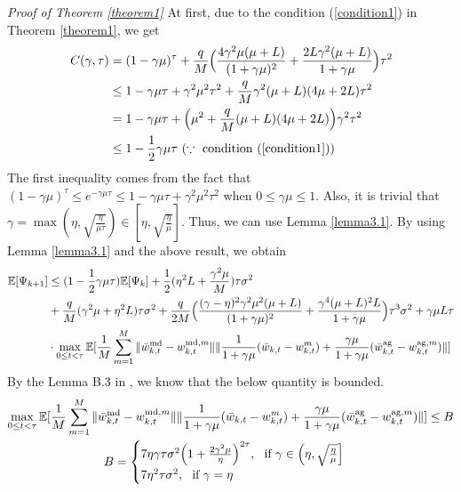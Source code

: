 \documentclass[11pt]{article}
\begin{document}
\emph{Proof of Theorem \ref{theorem1} } At first, due to the condition (\ref{condition1}) in Theorem \ref{theorem1}, we get
\begin{align*}
    C(\gamma, \tau) &= (1-\gamma\mu)^\tau + \frac{q}{M}\Big( \frac{4\gamma^2\mu(\mu + L)}{(1+\gamma\mu)^2} + \frac{2L\gamma^2(\mu+L)}{1+\gamma\mu}\Big)\tau^2 \\
    &\leq 1-\gamma\mu\tau+\gamma^2\mu^2\tau^2 + \frac{q}{M}\gamma^2(\mu+L)(4\mu+2L)\tau^2 \\
    &= 1-\gamma\mu\tau + \Big(\mu^2+\frac{q}{M}(\mu+L)(4\mu+2L)\Big)\gamma^2\tau^2 \\
    &\leq 1 - \frac{1}{2}\gamma\mu\tau \textrm{ }(\because \textrm{ condition } (\ref{condition1}))
\end{align*}
The first inequality comes from the fact that $(1-\gamma\mu)^\tau \leq e^{-\gamma\mu\tau} \leq 1-\gamma\mu\tau+\gamma^2\mu^2\tau^2$ when $0 \leq \gamma\mu \leq 1$.
Also, it is trivial that $\gamma = \max(\eta, \sqrt{\frac{\eta}{\mu\tau}}) \in [\eta, \sqrt{\frac{\eta}{\mu}}]$. Thus, we can use Lemma \ref{lemma3.1}. By using Lemma \ref{lemma3.1} and the above result, we obtain
\begin{align} \label{ineq3.7-1}
    \mathbb{E}[\Psi_{k+1}] &\leq (1-\frac{1}{2}\gamma\mu\tau) \mathbb{E}[\Psi_k] + \frac{1}{2}(\eta^2 L+\frac{\gamma^2\mu}{M})\tau\sigma^2\nonumber\\
     &+ \frac{q}{M}(\gamma^2\mu+\eta^2 L)\tau\sigma^2 + \frac{q}{2M}\Big(\frac{(\gamma-\eta)^2\gamma^2\mu^2(\mu+L)}{(1+\gamma\mu)^2} + \frac{\gamma^4(\mu+L)^2 L}{1+\gamma\mu}\Big)\tau^3\sigma^2 + \gamma\mu L \tau \nonumber\\
     &\cdot \max_{0\leq t <\tau} \mathbb{E}[\frac{1}{M} \sum_{m=1}^M \|\Bar{w}_{k, t}^{\textrm{md}} - w_{k, t}^{\textrm{md}, m}\|\|\frac{1}{1+\gamma\mu}(\Bar{w}_{k, t} - w_{k, t}^m) + \frac{\gamma\mu}{1+\gamma\mu}(\Bar{w}_{k, t}^{\textrm{ag}} - w_{k, t}^{\textrm{ag}, m})\|]
\end{align}
By the Lemma B.3 in \cite{Yeojoon-yuan2020federated}, we know that the below quantity is bounded.
\begin{gather*}
    \max_{0\leq t <\tau} \mathbb{E}[\frac{1}{M} \sum_{m=1}^M \|\Bar{w}_{k, t}^{\textrm{md}} - w_{k, t}^{\textrm{md}, m}\|\|\frac{1}{1+\gamma\mu}(\Bar{w}_{k, t} - w_{k, t}^m) + \frac{\gamma\mu}{1+\gamma\mu}(\Bar{w}_{k, t}^{\textrm{ag}} - w_{k, t}^{\textrm{ag}, m})\|] \leq B \\
    B=
    \begin{cases}
    7\eta\gamma\tau\sigma^2\Big(1+\frac{2\gamma^2\mu}{\eta}\Big)^{2\tau},~\textrm{ if } \gamma \in \Big(\eta, \sqrt{\frac{\eta}{\mu}}\Big]\\
    7\eta^2\tau\sigma^2,~\textrm{ if } \gamma=\eta
    \end{cases}
\end{gather*}
\end{document}

